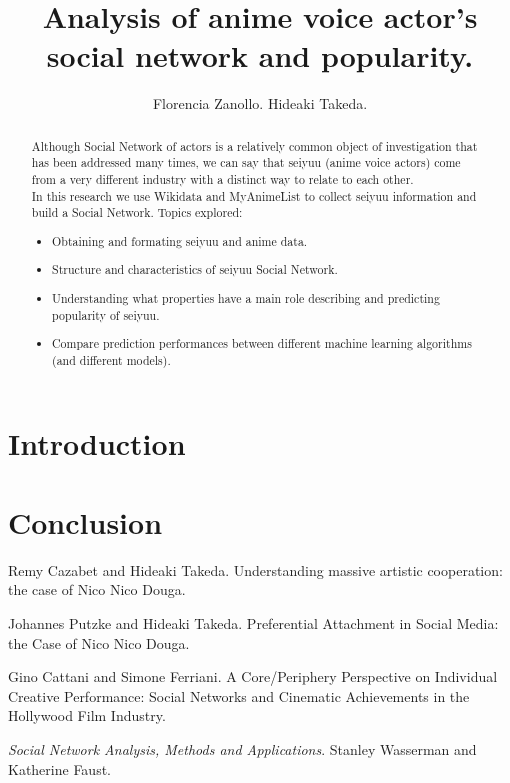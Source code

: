 \documentclass[a4paper]{report}
\begin{document}
	\title{Analysis of anime voice actor's social network and popularity.}
	\author{Florencia Zanollo. Hideaki Takeda.}
	\maketitle
	\tableofcontents

\begin{abstract}
	Although Social Network of actors is a relatively common object of investigation that has been addressed many times, we can say that seiyuu (anime voice actors) come from a very different industry with a distinct way to relate to each other. \\
	In this research we use Wikidata and MyAnimeList to collect seiyuu information and build a Social Network. Topics explored:
	\begin{itemize}
	\item Obtaining and formating seiyuu and anime data.
	\item Structure and characteristics of seiyuu Social Network.
	\item Understanding what properties have a main role describing and predicting popularity of seiyuu.
	\item Compare prediction performances between different machine learning algorithms (and different models).
	\end{itemize}
\end{abstract}

\chapter*{Introduction}






\chapter*{Conclusion}

	

\begin{thebibliography}{5}
	Remy Cazabet and Hideaki Takeda. Understanding massive artistic cooperation: the case of Nico Nico Douga.

	Johannes Putzke and Hideaki Takeda. Preferential Attachment in Social Media: the Case of Nico Nico Douga.
	
	Gino Cattani and Simone Ferriani. A Core/Periphery Perspective on Individual Creative Performance: Social Networks and Cinematic Achievements in the Hollywood Film Industry.

	{\em Social Network Analysis, Methods and Applications}. Stanley Wasserman and Katherine Faust. 
	
\end{thebibliography}
\end{document}
